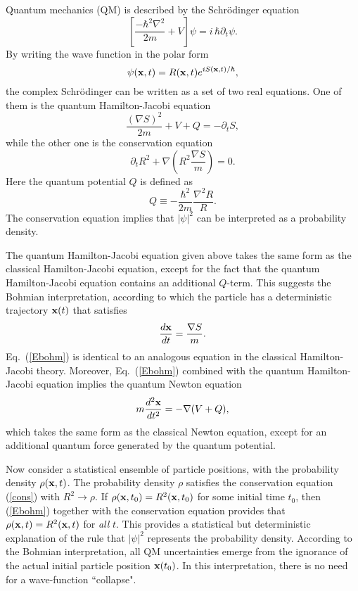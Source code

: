 \documentclass[12pt]{article} %
\begin{document}
Quantum mechanics (QM) is described by the Schr\"odinger equation
\begin{equation}
\left[ \frac{-\hbar^2\nabla^2}{2m}+V \right] \psi=i\,\hbar\partial_t \psi .
\end{equation}
By writing the wave function in the polar form
\begin{equation} 
\psi({\bf x},t)=R({\bf x},t)e^{iS({\bf x},t)/\hbar},
\end{equation}
the complex Schr\"odinger can be written as a set of two 
real equations. One of them is the
quantum Hamilton-Jacobi equation
\begin{equation}
\frac{(\nabla S)^2}{2m}+V+Q=-\partial_tS ,
\end{equation}
while the other one is the conservation equation
\begin{equation}\label{cons}
\partial_t R^2 + \nabla\left( R^2\frac{\nabla S}{m} \right) =0 .
\end{equation}
Here the quantum potential $Q$ is defined as
\begin{equation}
Q\equiv -\frac{\hbar^2}{2m}\frac{\nabla^2 R}{R} .
\end{equation}
The conservation equation implies that $|\psi|^2$ 
can be interpreted as a probability density. 

The quantum Hamilton-Jacobi equation given above takes the same form as the 
classical Hamilton-Jacobi equation, except for the fact that 
the quantum Hamilton-Jacobi equation contains an additional $Q$-term.
This suggests the Bohmian interpretation, according to which 
the particle has a deterministic trajectory ${\bf x}(t)$ that 
satisfies
\begin{equation}\label{Ebohm}
\frac{d {\bf x}}{dt}=\frac{\nabla S}{m}.
\end{equation}
Eq.~(\ref{Ebohm}) is identical to an analogous equation 
in the classical Hamilton-Jacobi theory. Moreover, 
Eq.~(\ref{Ebohm}) combined with the quantum Hamilton-Jacobi equation
implies the quantum Newton equation
\begin{equation}
m\frac{d^2 {\bf x}}{dt^2}=-\nabla(V+Q),
\end{equation}
which takes the same form as the classical Newton equation, 
except for an additional quantum force generated by the 
quantum potential.  

Now consider a statistical ensemble of particle positions, with the 
probability density $\rho({\bf x},t)$. 
The probability density $\rho$ 
satisfies the conservation equation (\ref{cons}) 
with $R^2\rightarrow\rho$. 
If $\rho({\bf x},t_0)=R^2({\bf x},t_0)$ for some initial time $t_0$, 
then (\ref{Ebohm}) together with the conservation equation provides that
$\rho({\bf x},t)=R^2({\bf x},t)$ for {\em all} $t$. 
This provides a statistical but deterministic explanation of the 
rule that $|\psi|^2$ represents the probability density. 
According to the Bohmian interpretation, all  
QM uncertainties
emerge from the ignorance of the actual initial particle position
${\bf x}(t_0)$. In this interpretation, 
there is no need for a wave-function ``collapse". 
 
\end{document}
